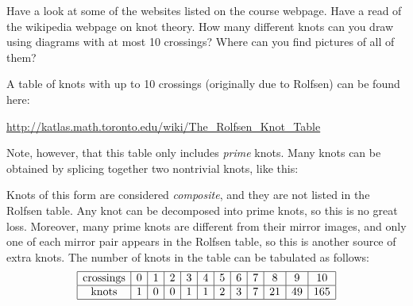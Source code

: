 \documentclass[a4paper]{amsart}
\begin{document}
\begin{exercise}
 Have a look at some of the websites listed on the course webpage.
 Have a read of the wikipedia webpage on knot theory.  How many
 different knots can you draw using diagrams with at most 10
 crossings?  Where can you find pictures of all of them?
\end{exercise}
\begin{solution}
 A table of knots with up to 10 crossings (originally due to Rolfsen)
 can be found here: 
 \begin{center}
  \url{http://katlas.math.toronto.edu/wiki/The\_Rolfsen\_Knot\_Table}
 \end{center}
 Note, however, that this table only includes \emph{prime} knots.
 Many knots can be obtained by splicing together two nontrivial knots,
 like this:
 \begin{center}
 \end{center}
 Knots of this form are considered \emph{composite}, and they are not
 listed in the Rolfsen table.  Any knot can be decomposed into prime
 knots, so this is no great loss.  Moreover, many prime knots are
 different from their mirror images, and only one of each mirror pair
 appears in the Rolfsen table, so this is another source of extra
 knots.  The number of knots in the table can be tabulated as follows:
 \[ \begin{array}{|c|c|c|c|c|c|c|c|c|c|c|c|} \hline
     \text{crossings} & 0 & 1 & 2 & 3 & 4 & 5 & 6 & 7 & 8 & 9 & 10 \\ \hline
     \text{knots}     & 1 & 0 & 0 & 1 & 1 & 2 & 3 & 7 & 21 & 49 & 165
     \\ \hline
    \end{array}
 \]
\end{solution}
\end{document}
